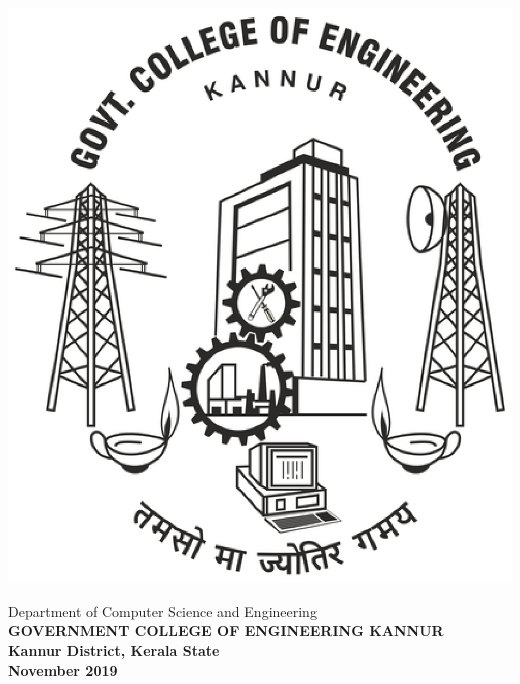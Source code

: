 \begin{titlepage}
\begin{center}
{\vspace{.75cm}
      \vspace*{10pt}
        \centerline{\includegraphics [keepaspectratio=true, scale=.3]{gcek.eps}}


\vspace{.6cm}
		  {{\sc Department of Computer Science and Engineering}}\\
		  {\bf \MakeUppercase{Government College  of Engineering Kannur}}\\ 
		  {\bf Kannur District, Kerala State}\\
	          {\bf November 2019}
}
\end{center}
\end{titlepage}

\cleardoublepage


